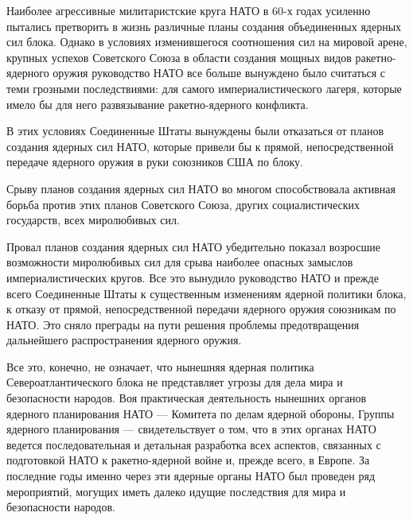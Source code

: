 \documentclass[12pt, a4paper, openany]{book}
\begin{document}
	Наиболее агрессивные милитаристские круга НАТО в 60-х годах усиленно пытались претворить в жизнь различные планы создания объединенных ядерных сил блока. Однако в условиях изменившегося соотношения сил на мировой арене, крупных успехов Советского Союза в области создания мощных видов ракетно-ядерного оружия руководство НАТО все больше вынуждено было считаться с теми грозными последствиями: для самого империалистического лагеря, которые имело бы для него развязывание ракетно-ядерного конфликта.
	
	В этих условиях Соединенные Штаты вынуждены были отказаться от планов создания ядерных сил НАТО, которые привели бы к прямой, непосредственной передаче ядерного оружия в руки союзников США по блоку.
	
	Срыву планов создания ядерных сил НАТО во многом способствовала активная борьба против этих планов Советского Союза, других социалистических государств, всех миролюбивых сил.
	
	Провал планов создания ядерных сил НАТО убедительно показал возросшие возможности миролюбивых сил для срыва наиболее опасных замыслов империалистических кругов. Все это вынудило руководство НАТО и прежде всего Соединенные Штаты к существенным изменениям ядерной политики блока, к отказу от прямой, непосредственной передачи ядерного оружия союзникам по НАТО. Это сняло преграды на пути решения проблемы предотвращения дальнейшего распространения ядерного оружия.
	
	Все это, конечно, не означает, что нынешняя ядерная политика Североатлантического блока не представляет угрозы для дела мира и безопасности народов. Воя практическая деятельность нынешних органов ядерного планирования НАТО — Комитета по делам ядерной обороны, Группы ядерного планирования — свидетельствует о том, что в этих органах НАТО ведется последовательная и детальная разработка всех аспектов, связанных с подготовкой НАТО к ракетно-ядерной войне и, прежде всего, в Европе. За последние годы именно через эти ядерные органы НАТО был проведен ряд мероприятий, могущих иметь далеко идущие последствия для мира и безопасности народов.
	
\end{document}
